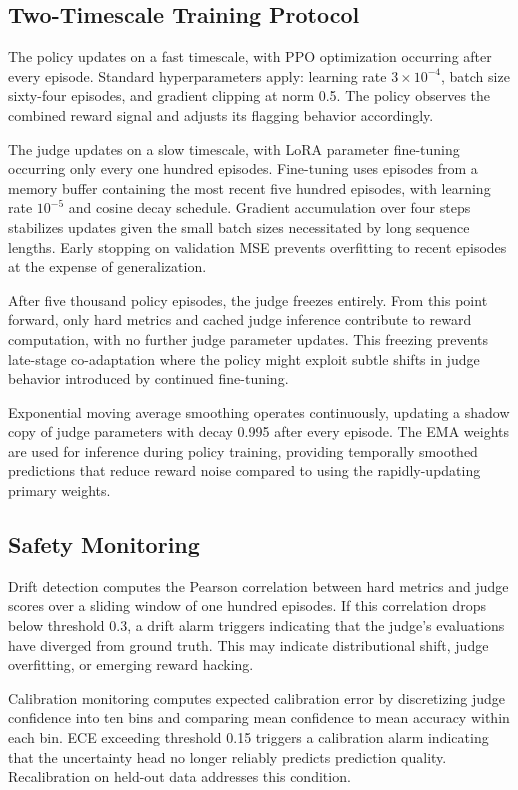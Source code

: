 \documentclass[11pt,a4paper]{article}
\begin{document}
\subsection{Two-Timescale Training Protocol}

The policy updates on a fast timescale, with PPO optimization occurring after every episode. Standard hyperparameters apply: learning rate $3 \times 10^{-4}$, batch size sixty-four episodes, and gradient clipping at norm 0.5. The policy observes the combined reward signal and adjusts its flagging behavior accordingly.

The judge updates on a slow timescale, with LoRA parameter fine-tuning occurring only every one hundred episodes. Fine-tuning uses episodes from a memory buffer containing the most recent five hundred episodes, with learning rate $10^{-5}$ and cosine decay schedule. Gradient accumulation over four steps stabilizes updates given the small batch sizes necessitated by long sequence lengths. Early stopping on validation MSE prevents overfitting to recent episodes at the expense of generalization.

After five thousand policy episodes, the judge freezes entirely. From this point forward, only hard metrics and cached judge inference contribute to reward computation, with no further judge parameter updates. This freezing prevents late-stage co-adaptation where the policy might exploit subtle shifts in judge behavior introduced by continued fine-tuning.

Exponential moving average smoothing operates continuously, updating a shadow copy of judge parameters with decay 0.995 after every episode. The EMA weights are used for inference during policy training, providing temporally smoothed predictions that reduce reward noise compared to using the rapidly-updating primary weights.

\subsection{Safety Monitoring}

Drift detection computes the Pearson correlation between hard metrics and judge scores over a sliding window of one hundred episodes. If this correlation drops below threshold 0.3, a drift alarm triggers indicating that the judge's evaluations have diverged from ground truth. This may indicate distributional shift, judge overfitting, or emerging reward hacking.

Calibration monitoring computes expected calibration error by discretizing judge confidence into ten bins and comparing mean confidence to mean accuracy within each bin. ECE exceeding threshold 0.15 triggers a calibration alarm indicating that the uncertainty head no longer reliably predicts prediction quality. Recalibration on held-out data addresses this condition.
\end{document}
